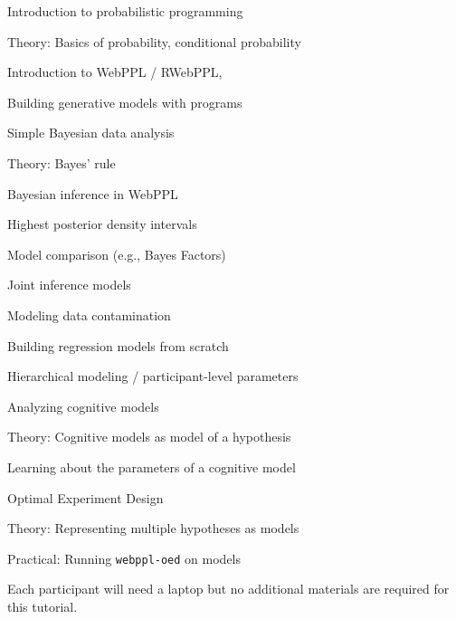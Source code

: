 \documentclass[10pt,letterpaper]{article}
\providecommand{\tightlist}{%
  \setlength{\itemsep}{0pt}\setlength{\parskip}{0pt}}
\newenvironment{itemize*}%
  {\begin{itemize}%
    \setlength{\itemsep}{0pt}%
    \setlength{\parskip}{0pt}}%
  {\end{itemize}}
\begin{document}
\begin{itemize*}
\tightlist
\item Introduction to probabilistic programming
	\begin{itemize*}
	\item Theory: Basics of probability, conditional probability
	\item Introduction to WebPPL / RWebPPL, 
	\item Building generative models with programs
	\end{itemize*}
\item Simple Bayesian data analysis
	\begin{itemize*}
	\item Theory: Bayes' rule
	\item Bayesian inference in WebPPL
	\item Highest posterior density intervals
	\item Model comparison (e.g., Bayes Factors)
	\end{itemize*}
\item Joint inference models
	\begin{itemize*}
	\item Modeling data contamination
	\item Building regression models from scratch 
	\item Hierarchical modeling  / participant-level parameters
	\end{itemize*}
\item Analyzing cognitive models
	\begin{itemize*}
	\item Theory: Cognitive models as model of a hypothesis
	\item Learning about the parameters of a cognitive model
	\end{itemize*}
\item Optimal Experiment Design
	\begin{itemize*}
	\item Theory: Representing multiple hypotheses as models 
	\item Practical: Running \texttt{webppl-oed} on models
	\end{itemize*}
\end{itemize*}

Each participant will need a laptop but no additional materials are required for this tutorial. 
\end{document}
